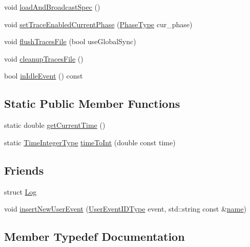 \begin{DoxyCompactItemize}
\item 
void \hyperlink{structvt_1_1trace_1_1_trace_a06f74f8d2c0c2fb97be14a264fd36a45}{load\+And\+Broadcast\+Spec} ()
\item 
void \hyperlink{structvt_1_1trace_1_1_trace_aa2740411eec8e1dabf10d60f48193e69}{set\+Trace\+Enabled\+Current\+Phase} (\hyperlink{namespacevt_a46ce6733d5cdbd735d561b7b4029f6d7}{Phase\+Type} cur\+\_\+phase)
\item 
void \hyperlink{structvt_1_1trace_1_1_trace_a2e07094a48c47b9c591003f0b57305c7}{flush\+Traces\+File} (bool use\+Global\+Sync)
\item 
void \hyperlink{structvt_1_1trace_1_1_trace_ac764c356a7f81abadfe643d618f22b15}{cleanup\+Traces\+File} ()
\item 
bool \hyperlink{structvt_1_1trace_1_1_trace_a1e7429d95dbddd9f235a02800d158d36}{in\+Idle\+Event} () const
\end{DoxyCompactItemize}
\subsection*{Static Public Member Functions}
\begin{DoxyCompactItemize}
\item 
static double \hyperlink{structvt_1_1trace_1_1_trace_a04cf6b76b4ced1bc90d246a34c948db5}{get\+Current\+Time} ()
\item 
static \hyperlink{structvt_1_1trace_1_1_trace_ab8db9218a8ab87f59773fcbf81433787}{Time\+Integer\+Type} \hyperlink{structvt_1_1trace_1_1_trace_a0b3d919285d2f0f33cebfb2ecbc9ad00}{time\+To\+Int} (double const time)
\end{DoxyCompactItemize}
\subsection*{Friends}
\begin{DoxyCompactItemize}
\item 
struct \hyperlink{structvt_1_1trace_1_1_trace_add132ae9df1b7ef820c8082c32b0f839}{Log}
\item 
void \hyperlink{structvt_1_1trace_1_1_trace_a17caa1eeb27fd6a4af8786a7f0679d77}{insert\+New\+User\+Event} (\hyperlink{namespacevt_1_1trace_a5908920d051c144c89f17c69ed262350}{User\+Event\+I\+D\+Type} event, std\+::string const \&\hyperlink{structvt_1_1trace_1_1_trace_aaae4bbf6d009229a5c8b9db67a127942}{name})
\end{DoxyCompactItemize}


\subsection{Member Typedef Documentation}
\mbox{\label{structvt_1_1trace_1_1_trace_a727542f4171681f2ef03df2c3abce04c}} 
